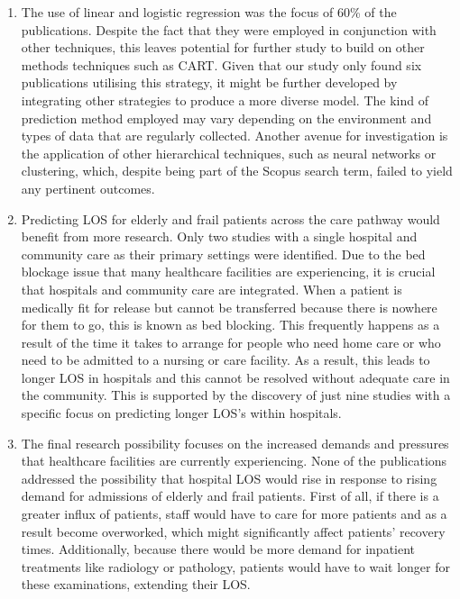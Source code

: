 \documentclass[../thesis.tex]{subfiles}
\begin{document}
\begin{enumerate}
    \item The use of linear and logistic regression was the focus of 60\% of the publications.  Despite the fact that they were employed in conjunction with other techniques, this leaves potential for further study to build on other methods techniques such as CART. Given that our study only found six publications utilising this strategy, it might be further developed by integrating other strategies to produce a more diverse model. The kind of prediction method employed may vary depending on the environment and types of data that are regularly collected. Another avenue for investigation is the application of other hierarchical techniques, such as neural networks or clustering, which, despite being part of the Scopus search term, failed to yield any pertinent outcomes.

    \item Predicting LOS for elderly and frail patients across the care pathway would benefit from more research. Only two studies with a single hospital and community care as their primary settings were identified. Due to the bed blockage issue that many healthcare facilities are experiencing, it is crucial that hospitals and community care are integrated. When a patient is medically fit for release but cannot be transferred because there is nowhere for them to go, this is known as bed blocking. This frequently happens as a result of the time it takes to arrange for people who need home care or who need to be admitted to a nursing or care facility. As a result, this leads to longer LOS in hospitals and this cannot be resolved without adequate care in the community. This is supported by the discovery of just nine studies with a specific focus on predicting longer LOS's within hospitals. 

    \item The final research possibility focuses on the increased demands and pressures that healthcare facilities are currently experiencing. None of the publications addressed the possibility that hospital LOS would rise in response to rising demand for admissions of elderly and frail patients. First of all, if there is a greater influx of patients, staff would have to care for more patients and as a result become overworked, which might significantly affect patients' recovery times. Additionally, because there would be more demand for inpatient treatments like radiology or pathology, patients would have to wait longer for these examinations, extending their LOS.
    
\end{enumerate}
\end{document}
